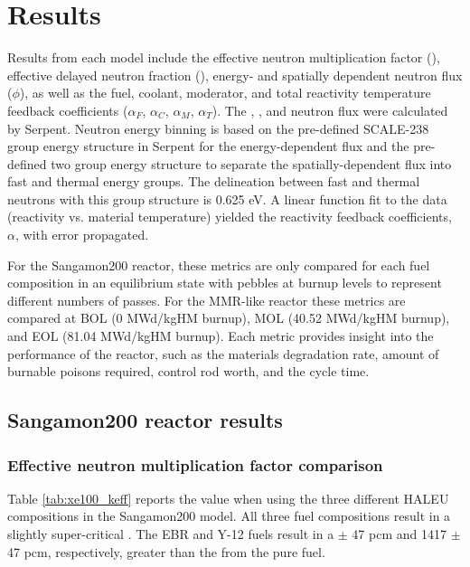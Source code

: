 \section{Results}
Results from each model include the effective neutron 
multiplication factor (\keff), effective delayed 
neutron fraction (\betaEff), energy- and spatially dependent 
neutron flux ($\phi$), as well as the fuel, coolant, moderator, and total reactivity 
temperature feedback coefficients ($\alpha_F$, $\alpha_C$, 
$\alpha_M$, $\alpha_T$). The
\keff, \betaEff, and neutron flux were calculated by Serpent. 
Neutron energy binning is based on the pre-defined SCALE-238 
group energy structure in 
Serpent for the energy-dependent flux and the pre-defined 
two group energy structure to separate the 
spatially-dependent flux into fast and thermal energy groups. The delineation between fast 
and thermal neutrons with this group structure is 0.625 eV.
A linear function fit to the
data (reactivity vs. material temperature) yielded the 
reactivity feedback coefficients, $\alpha$, with error 
propagated.

For the Sangamon200 reactor, these metrics are only compared for each fuel composition in an 
equilibrium state with pebbles at burnup levels to represent 
different numbers of passes. For the \gls*{MMR}-like reactor these metrics 
are compared at \gls*{BOL} (0 MWd/kgHM burnup), \gls*{MOL} (40.52 MWd/kgHM burnup), 
and \gls*{EOL} (81.04 MWd/kgHM burnup). Each metric provides  
insight into the performance of 
the reactor, such as the materials degradation rate, amount of burnable 
poisons required, control rod worth, and the cycle time. 

\subsection{Sangamon200 reactor results}

\subsubsection{Effective neutron multiplication factor comparison}
Table \ref{tab:xe100_keff} reports the \keff value when using the 
three different \gls*{HALEU} compositions in the Sangamon200 model. All three fuel compositions 
result in a slightly super-critical \keff.
The \gls*{EBR} and Y-12 fuels result in a  $\pm$ 47 pcm and 1417 $\pm$ 47 pcm, respectively, 
greater than the \keff from the pure fuel.

